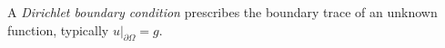 
A \emph{Dirichlet boundary condition} prescribes the boundary trace of an unknown function, typically $u|_{\partial\Omega}=g$.
